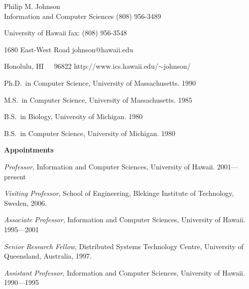 \documentclass[11pt]{article}
\begin{document}

\newcommand{\newcategory}[1]{\newenvironment{#1}
 {\sectionheading{#1}\begin{list}{}{\setlength{\labelwidth}{0cm} \setlength{\labelsep}{0cm} \setlength{\itemsep}{0ex plus0.2ex} \setlength{\itemindent}{-1cm} \setlength{\leftmargin}{1cm} \setlength{\parsep}{0ex plus0.2ex}}}{\end{list}\par}}
\newcommand{\sectionheading}[1]{\medskip\pagebreak[2]\par\noindent
 {\small\bf #1}\nopagebreak}

\begin{center}
Philip M. Johnson\\
Information and Computer Sciences \hfill (808) 956-3489

University of Hawaii              \hfill fax: (808) 956-3548

1680 East-West Road               \hfill johnson@hawaii.edu

Honolulu, HI~~~96822              \hfill http://www.ics.hawaii.edu/$\sim$johnson/

\end{center}

\newcategory{Professional Preparation}
\begin{Professional Preparation}
\item Ph.D.~in Computer Science, University of Massachusetts. 1990 
\item M.S.~in Computer Science, University of Massachusetts.  1985
\item B.S.~in Biology, University of Michigan. 1980
\item B.S.~in Computer Science, University of Michigan. 1980
\end{Professional Preparation}

\newcategory{Appointments}
\begin{Appointments}
\item {\em Professor},  Information and Computer
  Sciences, University of Hawaii.  2001---present

\item {\em Visiting Professor},  School of Engineering, Blekinge Institute of Technology, Sweden, 2006.

\item {\em Associate Professor},  Information and Computer
  Sciences, University of Hawaii.  1995---2001

\item {\em Senior Research Fellow},  Distributed Systems Technology Centre,
University of Queensland, Australia, 1997.

\item {\em Assistant Professor},   Information and Computer
  Sciences, University of Hawaii.  1990---1995

\end{Appointments}
\end{document}

